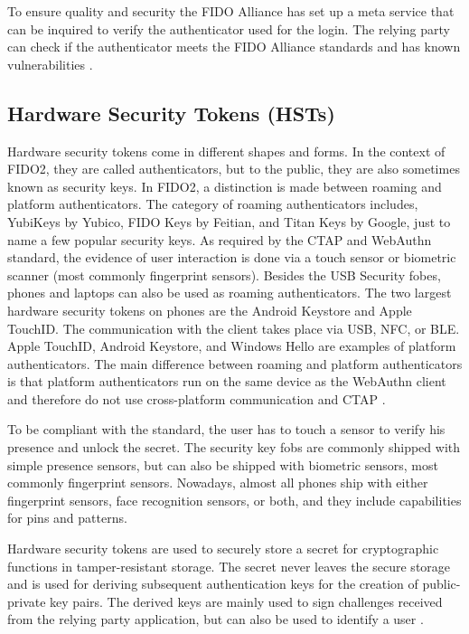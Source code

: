 \documentclass[runningheads]{llncs}
\begin{document}
To ensure quality and security the FIDO Alliance has set up a meta service that can be inquired to verify the authenticator used for the login. The relying party can check if the authenticator meets the FIDO Alliance standards and has known vulnerabilities \cite{9099190}.

\subsection{Hardware Security Tokens (HSTs)}
Hardware security tokens come in different shapes and forms. In the context of FIDO2, they are called authenticators, but to the public, they are also sometimes known as security keys. In FIDO2, a distinction is made between roaming and platform authenticators. The category of roaming authenticators includes, YubiKeys by Yubico, FIDO Keys by Feitian, and Titan Keys by Google, just to name a few popular security keys. As required by the CTAP and WebAuthn standard, the evidence of user interaction is done via a touch sensor or biometric scanner (most commonly fingerprint sensors). Besides the USB Security fobes, phones and laptops can also be used as roaming authenticators. The two largest hardware security tokens on phones are the Android Keystore and Apple TouchID. The communication with the client takes place via USB, NFC, or BLE.
Apple TouchID, Android Keystore, and Windows Hello are examples of platform authenticators. The main difference between roaming and platform authenticators is that platform authenticators run on the same device as the WebAuthn client and therefore do not use cross-platform communication and CTAP \cite{9152694}. 

To be compliant with the standard, the user has to touch a sensor to verify his presence and unlock the secret. The security key fobs are commonly shipped with simple presence sensors, but can also be shipped with biometric sensors, most commonly fingerprint sensors. Nowadays, almost all phones ship with either fingerprint sensors, face recognition sensors, or both, and they include capabilities for pins and patterns.

Hardware security tokens are used to securely store a secret for cryptographic functions in tamper-resistant storage. The secret never leaves the secure storage and is used for deriving subsequent authentication keys for the creation of public-private key pairs. The derived keys are mainly used to sign challenges received from the relying party application, but can also be used to identify a user \cite{272198}.
\end{document}
